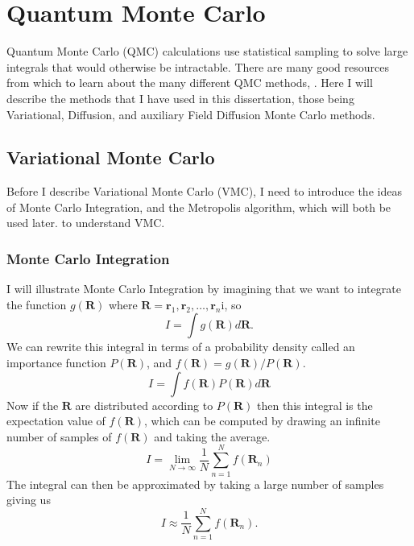 \section{Quantum Monte Carlo}
Quantum Monte Carlo (QMC) calculations use statistical sampling to solve large integrals that would otherwise be intractable. There are many good resources from which to learn about the many different QMC methods, . Here I will describe the methods that I have used in this dissertation, those being Variational, Diffusion, and auxiliary Field Diffusion Monte Carlo methods. 

\subsection{Variational Monte Carlo}
Before I describe Variational Monte Carlo (VMC), I need to introduce the ideas of Monte Carlo Integration, and the Metropolis algorithm, which will both be used later. to understand VMC.

\subsubsection{Monte Carlo Integration}
I will illustrate Monte Carlo Integration by imagining that we want to integrate the function $g(\mathbf{R})$ where $\mathbf{R}=\mathbf{r}_1,\mathbf{r}_2,\ldots,\mathbf{r}_n$i, so 
\begin{equation}
   I=\int g(\mathbf{R}) d\mathbf{R}.
\end{equation}
We can rewrite this integral in terms of a probability density called an importance function $P(\mathbf{R})$, and $f(\mathbf{R}) = g(\mathbf{R})/P(\mathbf{R})$.
\begin{equation}
   I=\int f(\mathbf{R}) P(\mathbf{R}) d\mathbf{R}
\end{equation}
Now if the $\mathbf{R}$ are distributed according to $P(\mathbf{R})$ then this integral is the expectation value of $f(\mathbf{R})$, which can be computed by drawing an infinite number of samples of $f(\mathbf{R})$ and taking the average.
\begin{equation}
   I=\lim\limits_{N\rightarrow\infty} \frac{1}{N} \sum\limits_{n=1}^N f(\mathbf{R}_n)
\end{equation}
The integral can then be approximated by taking a large number of samples giving us
\begin{equation}
   I \approx \frac{1}{N} \sum\limits_{n=1}^N f(\mathbf{R}_n).
\end{equation}

